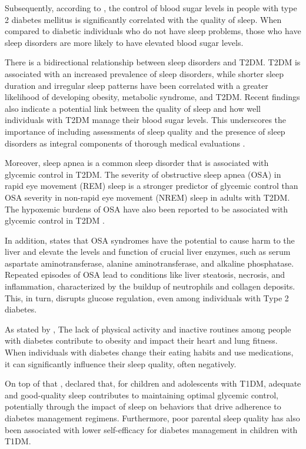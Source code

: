 Subsequently, according to \textcite{amelia-2020}, the control of blood sugar
levels in people with type 2 diabetes mellitus is significantly correlated with
the quality of sleep. When compared to diabetic individuals who do not have
sleep problems, those who have sleep disorders are more likely to have elevated
blood sugar levels.

There is a bidirectional relationship between sleep disorders and T2DM. T2DM is
associated with an increased prevalence of sleep disorders, while shorter sleep
duration and irregular sleep patterns have been correlated with a greater
likelihood of developing obesity, metabolic syndrome, and T2DM. Recent findings
also indicate a potential link between the quality of sleep and how well
individuals with T2DM manage their blood sugar levels. This underscores the
importance of including assessments of sleep quality and the presence of sleep
disorders as integral components of thorough medical evaluations
\parencite{khandelwal-2017}.

Moreover, sleep apnea is a common sleep disorder that is associated with
glycemic control in T2DM. The severity of obstructive sleep apnea (OSA) in rapid
eye movement (REM) sleep is a stronger predictor of glycemic control than OSA
severity in non-rapid eye movement (NREM) sleep in adults with T2DM. The
hypoxemic burdens of OSA have also been reported to be associated with glycemic
control in T2DM \parencite{koren-2014}.

In addition, \textcite{shibabaw-2023} states that OSA syndromes have the
potential to cause harm to the liver and elevate the levels and function of
crucial liver enzymes, such as serum aspartate aminotransferase, alanine
aminotransferase, and alkaline phosphatase. Repeated episodes of OSA lead to
conditions like liver steatosis, necrosis, and inflammation, characterized by
the buildup of neutrophils and collagen deposits. This, in turn, disrupts
glucose regulation, even among individuals with Type 2 diabetes.

As stated by \textcite{pathak-2019}, The lack of physical activity and inactive
routines among people with diabetes contribute to obesity and impact their heart
and lung fitness. When individuals with diabetes change their eating habits and
use medications, it can significantly influence their sleep quality, often
negatively.

On top of that \textcite{perez-2018}, declared that, for children and adolescents
with T1DM, adequate and good-quality sleep contributes to maintaining optimal
glycemic control, potentially through the impact of sleep on behaviors that
drive adherence to diabetes management regimens. Furthermore, poor parental
sleep quality has also been associated with lower self-efficacy for diabetes
management in children with T1DM.

